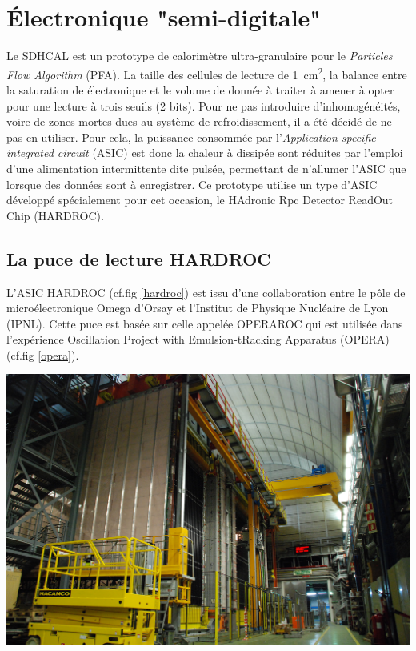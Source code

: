 \section{Électronique "semi-digitale"}
Le SDHCAL est un prototype de calorimètre ultra-granulaire pour le \textit{Particles Flow Algorithm} (PFA). La taille des cellules de lecture de \SI{1}{\square\centi\meter}, la balance entre la saturation de électronique et le volume de donnée à traiter à amener à opter pour une lecture à trois seuils (\num{2} bits). Pour ne pas introduire d'inhomogénéités, voire de zones mortes dues au système de refroidissement, il a été décidé de ne pas en utiliser. Pour cela, la puissance consommée par l'\textit{Application-specific integrated circuit} (ASIC) est donc la chaleur à dissipée sont réduites par l'emploi d'une alimentation intermittente dite pulsée, permettant de n'allumer l'ASIC que lorsque des données sont à enregistrer. Ce prototype utilise un type d'ASIC développé spécialement pour cet occasion, le HAdronic Rpc Detector ReadOut Chip (HARDROC)\cite{Dulucq:2010ssa}.

\subsection{La puce de lecture HARDROC}
L'ASIC HARDROC (cf.fig \ref{hardroc}) est issu d'une collaboration entre le pôle de microélectronique Omega d'Orsay et l'Institut de Physique Nucléaire de Lyon (IPNL). Cette puce est basée sur celle appelée OPERAROC qui est utilisée dans l'expérience Oscillation Project with Emulsion-tRacking Apparatus (OPERA) (cf.fig \ref{opera}).

\marginpar
{
	\centering
	\includegraphics[width=\marginparwidth]{GLA/OPERA.jpg}
	\label{opera}
}

